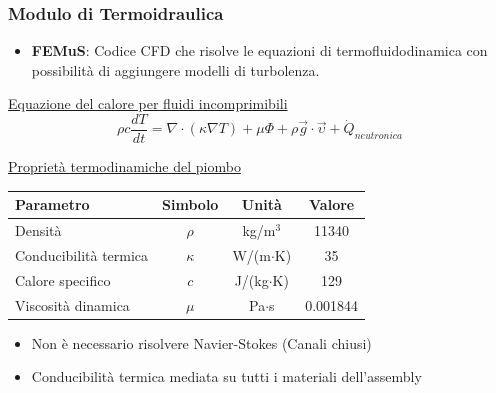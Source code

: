  \begin{frame}
  \frametitle{Modulo di Termoidraulica}
   \begin{center}
   \begin{block}{}
   \begin{itemize}
    \item \textbf{\textcolor{mygreen}{FEMuS}}: Codice CFD che risolve le equazioni di termofluidodinamica
    con possibilità di aggiungere modelli di turbolenza.   
    \end{itemize}
      \end{block}
      
    \underline{Equazione del calore per fluidi incomprimibili}
    \begin{equation*}
 \rho c \frac{dT}{dt}=\nabla \cdot (\kappa \nabla T) + \mu \Phi + \rho 
\vec{g}\cdot \vec{\upsilon} + \dot{Q}_{neutronica} 
\end{equation*}



 \underline{Proprietà termodinamiche del piombo}
 \begin{table}[!htb]
\centering
 \begin{tabular}{lccc}
\hline
Parametro & Simbolo & Unità & Valore \\
\hline
Densità & $\rho$ & kg/m$^3$ & 11340 \\
Conducibilità termica & $\kappa$ & W/(m$\cdot$K) & 35 \\
Calore specifico & $c$ & J/(kg$\cdot$K) & 129 \\
Viscosità dinamica & $\mu$ & Pa$\cdot$s & 0.001844 \\
\hline
\end{tabular}
\end{table}

  \begin{itemize}
 \item Non è necessario risolvere Navier-Stokes (Canali chiusi)
 \item Conducibilità termica mediata su tutti i materiali dell'assembly 
\end{itemize}

 \end{center}

\end{frame}

